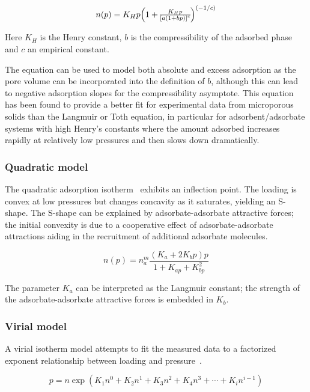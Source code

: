 \begin{equation}\label{eqn:pyg:jseaton}
    n(p) = K_H p \Big{(1 + \frac{K_H p}{{[a {(1 + b p)}]}^c}\Big)}^{(-1/c)}
\end{equation}

Here \(K_H\) is the Henry constant, \(b\) is the compressibility of the
adsorbed phase and \(c\) an empirical constant.

The equation can be used to model both absolute and excess adsorption as the pore
volume can be incorporated into the definition of \(b\), although this can lead
to negative adsorption slopes for the compressibility asymptote.
This equation has been found to provide a better fit for experimental data
from microporous solids than the Langmuir or Toth equation, in particular for
adsorbent/adsorbate systems with high Henry’s constants where the amount adsorbed
increases rapidly at relatively low pressures and then slows down dramatically.

\subsubsection{Quadratic model}

The quadratic adsorption isotherm~\cite{hillIntroductionStatisticalThermodynamics1986} 
exhibits an inflection point. The loading is convex at low 
pressures but changes concavity as it saturates, yielding
an S-shape. The S-shape can be explained by adsorbate-adsorbate attractive
forces; the initial convexity is due to a cooperative
effect of adsorbate-adsorbate attractions aiding in the recruitment of
additional adsorbate molecules.

\begin{equation}\label{eqn:pyg:quad}
    n(p) = n_a^m \frac{(K_a + 2 K_b p)p}{1+K_{ap} + K_{bp}^2}
\end{equation}

The parameter \(K_a\) can be interpreted as the Langmuir constant; the
strength of the adsorbate-adsorbate attractive forces is embedded in \(K_b\).


\subsubsection{Virial model}

A virial isotherm model attempts to fit the measured data to a factorized
exponent relationship between loading and 
pressure~\cite{myersThermodynamicsAdsorptionPorous2002}.

\begin{equation}\label{eqn:pyg:virial}
    p = n \exp{(K_1n^0 + K_2n^1 + K_3n^2 + K_4n^3 + \cdots + K_i n^{i-1})}
\end{equation}

